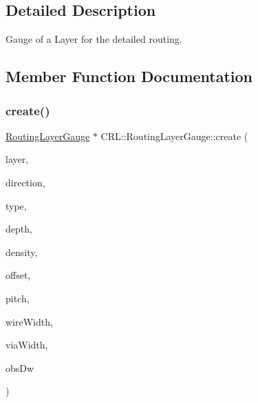 \subsection{Detailed Description}
Gauge of a Layer for the detailed routing. 

\subsection{Member Function Documentation}
\mbox{\label{classCRL_1_1RoutingLayerGauge_afe17db013bf6a933c2af4e847bfd7918}} 
\subsubsection{\texorpdfstring{create()}{create()}}
{\footnotesize\ttfamily \mbox{\hyperlink{classCRL_1_1RoutingLayerGauge}{Routing\+Layer\+Gauge}} $\ast$ C\+R\+L\+::\+Routing\+Layer\+Gauge\+::create (\begin{DoxyParamCaption}\item[{const \textbf{ Layer} $\ast$}]{layer,  }\item[{\mbox{\hyperlink{namespaceConstant_ac081a99f2b64361919ed5d9f37c0f9af}{Constant\+::\+Direction}}}]{direction,  }\item[{\mbox{\hyperlink{namespaceConstant_ab2e46a17cc373a268c5c24fa0e2067e5}{Constant\+::\+Layer\+Gauge\+Type}}}]{type,  }\item[{unsigned int}]{depth,  }\item[{double}]{density,  }\item[{\textbf{ Db\+U\+::\+Unit}}]{offset,  }\item[{\textbf{ Db\+U\+::\+Unit}}]{pitch,  }\item[{\textbf{ Db\+U\+::\+Unit}}]{wire\+Width,  }\item[{\textbf{ Db\+U\+::\+Unit}}]{via\+Width,  }\item[{\textbf{ Db\+U\+::\+Unit}}]{obs\+Dw }\end{DoxyParamCaption})\hspace{0.3cm}{\ttfamily [static]}}


